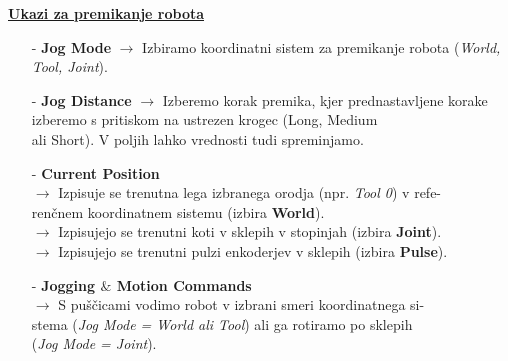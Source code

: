\noindent %
\textbf{\underline{Ukazi za premikanje robota}} %
\vspace{0.5cm}
\begin{enumerate}

    \item[-] \textbf{Jog Mode} $\longrightarrow$ Izbiramo koordinatni sistem za premikanje robota (\emph{World,\\ %
        \hspace*{2.3cm}         Tool, Joint}). %
\vspace{0.2cm}
    \item[-] \textbf{Jog Distance} $\longrightarrow$ Izberemo korak premika, kjer prednastavljene korake \\%
        \hspace*{2.8cm}            izberemo s pritiskom na ustrezen krogec (Long, Medium\\%
        \hspace*{2.8cm}            ali Short). V poljih lahko vrednosti tudi spreminjamo. %
\vspace{0.2cm}
    \item[-] \textbf{Current Position} \\ %
        \hspace*{1.0cm}    $\longrightarrow$ Izpisuje se trenutna lega izbranega orodja (npr. \emph{Tool 0}) v refe-\\%
        \hspace*{1.7cm}    renčnem koordinatnem sistemu (izbira \textbf{World}). \\%
        \hspace*{1.0cm}    $\longrightarrow$ Izpisujejo se trenutni koti v sklepih v stopinjah (izbira \textbf{Joint}).\\%
        \hspace*{1.0cm}    $\longrightarrow$ Izpisujejo se trenutni pulzi enkoderjev v sklepih (izbira \textbf{Pulse}).\\%
\vspace{0.2cm}
    \item[-] \textbf{Jogging $\&$ Motion Commands} \\ %
        \hspace*{1.0cm}    $\longrightarrow$ S puščicami vodimo robot v izbrani smeri koordinatnega si-\\%
        \hspace*{1.7cm}    stema (\emph{Jog Mode = World ali Tool}) ali ga rotiramo po sklepih \\%
        \hspace*{1.7cm}  (\emph{Jog Mode = Joint}). %
\end{enumerate}

